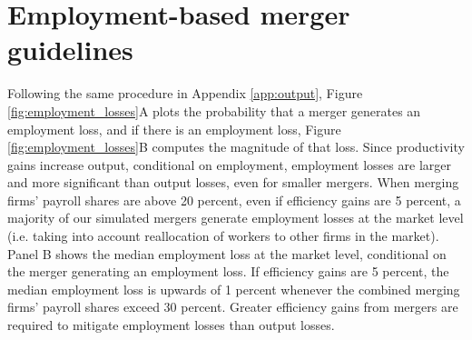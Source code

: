 \documentclass[12pt]{article}
\theoremstyle{prop}
\begin{document}
\section{Employment-based merger guidelines}
\label{app:emp}
Following the same procedure in Appendix \ref{app:output}, Figure \ref{fig:employment_losses}A plots the probability that a merger generates an employment loss, and if there is an employment loss, Figure \ref{fig:employment_losses}B computes the magnitude of that loss.
Since productivity gains increase output, conditional on employment, employment losses are larger and more significant than output losses, even for smaller mergers. 
When merging firms' payroll shares are above 20 percent, even if efficiency gains are 5 percent, a majority of our simulated mergers generate employment losses at the market level (i.e. taking into account reallocation of workers to other firms in the market). 
Panel B shows the median employment loss at the market level, conditional on the merger generating an employment loss. 
If efficiency gains are 5 percent, the median employment loss is upwards of 1 percent whenever the combined merging firms' payroll shares exceed 30 percent. 
Greater efficiency gains from mergers are required to mitigate employment losses than output losses.
\end{document}
